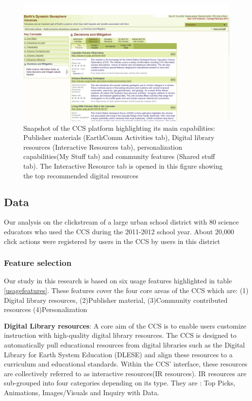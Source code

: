 \documentclass{acm_proc_article-sp}
\begin{document}
\begin{figure}
\caption{Snapshot of the CCS platform highlighting its main capabilities: Publisher materials (EarthComm Activities tab), Digital library resources (Interactive Resources tab), personalization capabilities(My Stuff tab) and community features (Shared stuff tab). The Interactive Resource tab is opened in this figure showing the top recommended digital resources}
\label{fig:ccsimage}

\includegraphics[width=1 \linewidth]{./ccsimage}
\end{figure}


\subsection{Data}
Our analysis  on the clickstream of a large urban school district with 80 science educators who used the CCS during the 2011-2012 school year. About 20,000 click actions were registered by users in the CCS by users in this district

\subsubsection{Feature selection}
Our study in this research is based on six usage features highlighted in table \ref{usagefeatures}. These features cover the four core areas of the CCS which are: (1) Digital library resources, (2)Publisher material, (3)Community contributed resources (4)Personalization
 
\textbf{Digital Library resources}:
A core aim of the CCS is to enable users customize instruction with high-quality digital library resources. The CCS is designed to automatically pull educational resources from digital libraries such as the Digital Library for Earth System Education (DLESE) and align these resources to a curriculum and educational standards. Within the CCS' interface, these resources are collectively referred to as interactive resources(IR resources). IR resources are sub-grouped into four categories depending on its type. They are : Top Picks, Animations, Images/Visuals and Inquiry with Data. 
\end{document}

